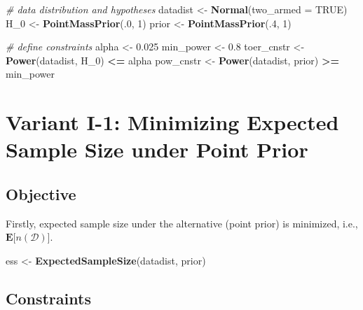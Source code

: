 \documentclass[]{book}
\newenvironment{Shaded}{\begin{snugshade}}{\end{snugshade}}
\newcommand{\CommentTok}[1]{\textcolor[rgb]{0.56,0.35,0.01}{\textit{#1}}}
\newcommand{\DataTypeTok}[1]{\textcolor[rgb]{0.13,0.29,0.53}{#1}}
\newcommand{\DecValTok}[1]{\textcolor[rgb]{0.00,0.00,0.81}{#1}}
\newcommand{\FloatTok}[1]{\textcolor[rgb]{0.00,0.00,0.81}{#1}}
\newcommand{\KeywordTok}[1]{\textcolor[rgb]{0.13,0.29,0.53}{\textbf{#1}}}
\newcommand{\NormalTok}[1]{#1}
\newcommand{\OperatorTok}[1]{\textcolor[rgb]{0.81,0.36,0.00}{\textbf{#1}}}
\newcommand{\OtherTok}[1]{\textcolor[rgb]{0.56,0.35,0.01}{#1}}
\newcommand{\StringTok}[1]{\textcolor[rgb]{0.31,0.60,0.02}{#1}}
\begin{document}
\begin{Shaded}
\begin{Highlighting}[]
\CommentTok{# data distribution and hypotheses}
\NormalTok{datadist   <-}\StringTok{ }\KeywordTok{Normal}\NormalTok{(}\DataTypeTok{two_armed =} \OtherTok{TRUE}\NormalTok{)}
\NormalTok{H_}\DecValTok{0}\NormalTok{        <-}\StringTok{ }\KeywordTok{PointMassPrior}\NormalTok{(.}\DecValTok{0}\NormalTok{, }\DecValTok{1}\NormalTok{)}
\NormalTok{prior      <-}\StringTok{ }\KeywordTok{PointMassPrior}\NormalTok{(.}\DecValTok{4}\NormalTok{, }\DecValTok{1}\NormalTok{)}

\CommentTok{# define constraints}
\NormalTok{alpha      <-}\StringTok{ }\FloatTok{0.025}
\NormalTok{min_power  <-}\StringTok{ }\FloatTok{0.8}
\NormalTok{toer_cnstr <-}\StringTok{ }\KeywordTok{Power}\NormalTok{(datadist, H_}\DecValTok{0}\NormalTok{)   }\OperatorTok{<=}\StringTok{ }\NormalTok{alpha}
\NormalTok{pow_cnstr  <-}\StringTok{ }\KeywordTok{Power}\NormalTok{(datadist, prior) }\OperatorTok{>=}\StringTok{ }\NormalTok{min_power}
\end{Highlighting}
\end{Shaded}

\hypertarget{variantI_1}{%
\section{Variant I-1: Minimizing Expected Sample Size under Point Prior}\label{variantI_1}}

\hypertarget{objective}{%
\subsection{Objective}\label{objective}}

Firstly, expected sample size under the alternative (point prior)
is minimized, i.e.,
\(\boldsymbol{E}\big[n(\mathcal{D})\big]\).

\begin{Shaded}
\begin{Highlighting}[]
\NormalTok{ess <-}\StringTok{ }\KeywordTok{ExpectedSampleSize}\NormalTok{(datadist, prior)}
\end{Highlighting}
\end{Shaded}

\hypertarget{constraints}{%
\subsection{Constraints}\label{constraints}}
\end{document}

